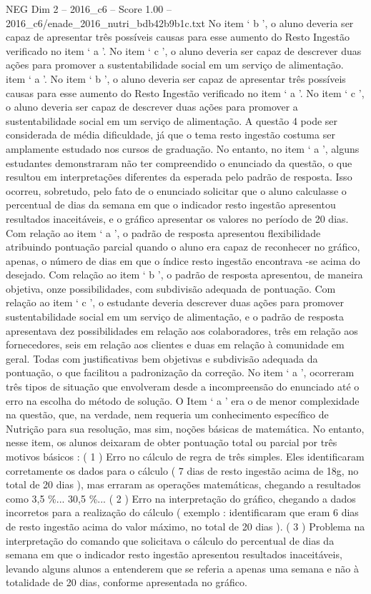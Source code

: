 \begin{textsample}{NEG Dim 2 – 2016\_c6 – Score 1.00 – 2016\_c6/enade\_2016\_nutri\_bdb42b9b1c.txt}
No item ‘ b ’, o aluno deveria ser capaz de apresentar três possíveis causas para esse aumento do Resto Ingestão verificado no item ‘ a ’.
No item ‘ c ’, o aluno deveria ser capaz de descrever duas ações para promover a sustentabilidade social em um serviço de alimentação. item ‘ a ’.
No item ‘ b ’, o aluno deveria ser capaz de apresentar três possíveis causas para esse aumento do Resto Ingestão verificado no item ‘ a ’.
No item ‘ c ’, o aluno deveria ser capaz de descrever duas ações para promover a sustentabilidade social em um serviço de alimentação.
A questão 4 pode ser considerada de média dificuldade, já que o tema resto ingestão costuma ser amplamente estudado nos cursos de graduação.
No entanto, no item ‘ a ’, alguns estudantes demonstraram não ter compreendido o enunciado da questão, o que resultou em interpretações diferentes da esperada pelo padrão de resposta.
Isso ocorreu, sobretudo, pelo fato de o enunciado solicitar que o aluno calculasse o percentual de dias da semana em que o indicador resto ingestão apresentou resultados inaceitáveis, e o gráfico apresentar os valores no período de 20 dias.
Com relação ao item ‘ a ’, o padrão de resposta apresentou flexibilidade atribuindo pontuação parcial quando o aluno era capaz de reconhecer no gráfico, apenas, o número de dias em que o índice resto ingestão encontrava -se acima do desejado.
Com relação ao item ‘ b ’, o padrão de resposta apresentou, de maneira objetiva, onze possibilidades, com subdivisão adequada de pontuação.
Com relação ao item ‘ c ’, o estudante deveria descrever duas ações para promover sustentabilidade social em um serviço de alimentação, e o padrão de resposta apresentava dez possibilidades em relação aos colaboradores, três em relação aos fornecedores, seis em relação aos clientes e duas em relação à comunidade em geral.
Todas com justificativas bem objetivas e subdivisão adequada da pontuação, o que facilitou a padronização da correção.
No item ‘ a ’, ocorreram três tipos de situação que envolveram desde a incompreensão do enunciado até o erro na escolha do método de solução.
O Item ‘ a ’ era o de menor complexidade na questão, que, na verdade, nem requeria um conhecimento específico de Nutrição para sua resolução, mas sim, noções básicas de matemática.
No entanto, nesse item, os alunos deixaram de obter pontuação total ou parcial por três motivos básicos : ( 1 ) Erro no cálculo de regra de três simples.
Eles identificaram corretamente os dados para o cálculo ( 7 dias de resto ingestão acima de 18g, no total de 20 dias ), mas erraram as operações matemáticas, chegando a resultados como 3,5 \%... 30,5 \%... ( 2 ) Erro na interpretação do gráfico, chegando a dados incorretos para a realização do cálculo ( exemplo : identificaram que eram 6 dias de resto ingestão acima do valor máximo, no total de 20 dias ). ( 3 ) Problema na interpretação do comando que solicitava o cálculo do percentual de dias da semana em que o indicador resto ingestão apresentou resultados inaceitáveis, levando alguns alunos a entenderem que se referia a apenas uma semana e não à totalidade de 20 dias, conforme apresentada no gráfico.

\end{textsample}

